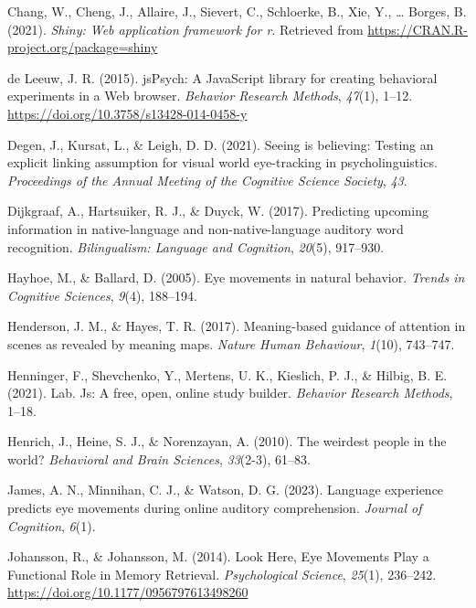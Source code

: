 \documentclass[
  man,floatsintext]{apa6}
\newlength{\cslhangindent}
\newenvironment{CSLReferences}[2] %
 {\begin{list}{}{%
  \setlength{\itemindent}{0pt}
  \setlength{\leftmargin}{0pt}
  \setlength{\parsep}{0pt}
  \ifodd #1
   \setlength{\leftmargin}{\cslhangindent}
   \setlength{\itemindent}{-1\cslhangindent}
  \fi
  \setlength{\itemsep}{#2\baselineskip}}}
 {\end{list}}
\begin{document}
\begin{CSLReferences}{1}{0}
Chang, W., Cheng, J., Allaire, J., Sievert, C., Schloerke, B., Xie, Y., \ldots{} Borges, B. (2021). \emph{Shiny: Web application framework for r}. Retrieved from \url{https://CRAN.R-project.org/package=shiny}

de Leeuw, J. R. (2015). {jsPsych}: {A JavaScript} library for creating behavioral experiments in a {Web} browser. \emph{Behavior Research Methods}, \emph{47}(1), 1--12. \url{https://doi.org/10.3758/s13428-014-0458-y}

Degen, J., Kursat, L., \& Leigh, D. D. (2021). Seeing is believing: Testing an explicit linking assumption for visual world eye-tracking in psycholinguistics. \emph{Proceedings of the Annual Meeting of the Cognitive Science Society}, \emph{43}.

Dijkgraaf, A., Hartsuiker, R. J., \& Duyck, W. (2017). Predicting upcoming information in native-language and non-native-language auditory word recognition. \emph{Bilingualism: Language and Cognition}, \emph{20}(5), 917--930.

Hayhoe, M., \& Ballard, D. (2005). Eye movements in natural behavior. \emph{Trends in Cognitive Sciences}, \emph{9}(4), 188--194.

Henderson, J. M., \& Hayes, T. R. (2017). Meaning-based guidance of attention in scenes as revealed by meaning maps. \emph{Nature Human Behaviour}, \emph{1}(10), 743--747.

Henninger, F., Shevchenko, Y., Mertens, U. K., Kieslich, P. J., \& Hilbig, B. E. (2021). Lab. Js: A free, open, online study builder. \emph{Behavior Research Methods}, 1--18.

Henrich, J., Heine, S. J., \& Norenzayan, A. (2010). The weirdest people in the world? \emph{Behavioral and Brain Sciences}, \emph{33}(2-3), 61--83.

James, A. N., Minnihan, C. J., \& Watson, D. G. (2023). Language experience predicts eye movements during online auditory comprehension. \emph{Journal of Cognition}, \emph{6}(1).

Johansson, R., \& Johansson, M. (2014). Look {Here}, {Eye Movements Play} a {Functional Role} in {Memory Retrieval}. \emph{Psychological Science}, \emph{25}(1), 236--242. \url{https://doi.org/10.1177/0956797613498260}


\end{CSLReferences}
\end{document}
